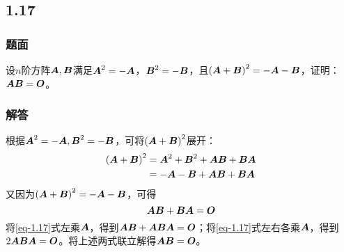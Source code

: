 \documentclass[9pt,xcolor=svgnames]{beamer} %
\begin{document}
\subsection*{1.17}
\begin{frame}
    \frametitle{题面}
    设\(n\)阶方阵\(\mata,\matb\)满足\(\mata^2=-\mata\)，\(\matb^2=-\matb\)，且\(\spar{\mata+\matb}^2=-\mata-\matb\)，证明：\(\mata\matb=\mato\)。
\end{frame}
\begin{frame}
    \frametitle{解答}
    根据\(\mata^2=-\mata,\matb^2=-\matb\)，可将\(\spar{\mata+\matb}^2\)展开：
    \begin{align*}
        \spar{\mata+\matb}^2 & =\mata^2+\matb^2+\mata\matb+\matb\mata \\
                             & =-\mata-\matb+\mata\matb+\matb\mata
    \end{align*}
    又因为\(\spar{\mata+\matb}^2=-\mata-\matb\)，可得
    \begin{equation}\label{eq-1.17}
        \mata\matb+\matb\mata=\mato
    \end{equation}
    将\eqref{eq-1.17}式左乘\(\mata\)，得到\(\mata\matb+\mata\matb\mata=\mato\)；将\eqref{eq-1.17}式左右各乘\(\mata\)，得到\(2\mata\matb\mata=\mato\)。将上述两式联立解得\(\mata\matb=\mato\)。
\end{frame}
\end{document}

